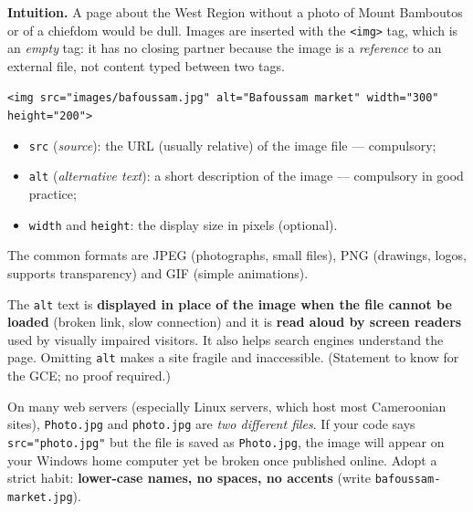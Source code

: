\documentclass[11pt]{article}
\newcommand{\cle}[1]{{\popxbold\color{popdark}#1}}
\newcounter{popsec}
\newcounter{popsub}
\newcommand{\courssub}[1]{%
  \stepcounter{popsub}%
  \par\vspace{9pt}\noindent{\popxbold\fontsize{11.5}{13}\selectfont\color{popink}{\color{poporange}\thepopsec.\thepopsub}\hspace{6pt}#1}\par\nopagebreak\vspace{4pt}
}
\begin{document}
\courssub{Inserting images with \texttt{<img>}}

\textbf{Intuition.} A page about the West Region without a photo of Mount Bamboutos or of a chiefdom would be dull. Images are inserted with the \texttt{<img>} tag, which is an \emph{empty} tag: it has no closing partner because the image is a \emph{reference} to an external file, not content typed between two tags.

\begin{definition}
\begin{center}
\texttt{<img src="images/bafoussam.jpg" alt="Bafoussam market" width="300" height="200">}
\end{center}
\begin{itemize}
\item \texttt{src} (\emph{source}): the URL (usually relative) of the image file --- compulsory;
\item \texttt{alt} (\emph{alternative text}): a short description of the image --- compulsory in good practice;
\item \texttt{width} and \texttt{height}: the display size in pixels (optional).
\end{itemize}
The common formats are \cle{JPEG} (photographs, small files), \cle{PNG} (drawings, logos, supports transparency) and \cle{GIF} (simple animations).
\end{definition}

\begin{propriete}
The \texttt{alt} text is \textbf{displayed in place of the image when the file cannot be loaded} (broken link, slow connection) and it is \textbf{read aloud by screen readers} used by visually impaired visitors. It also helps search engines understand the page. Omitting \texttt{alt} makes a site fragile and inaccessible. (Statement to know for the GCE; no proof required.)
\end{propriete}

\begin{attention}
On many web servers (especially Linux servers, which host most Cameroonian sites), \texttt{Photo.jpg} and \texttt{photo.jpg} are \emph{two different files}. If your code says \texttt{src="photo.jpg"} but the file is saved as \texttt{Photo.jpg}, the image will appear on your Windows home computer yet be broken once published online. Adopt a strict habit: \textbf{lower-case names, no spaces, no accents} (write \texttt{bafoussam-market.jpg}).
\end{attention}
\end{document}
